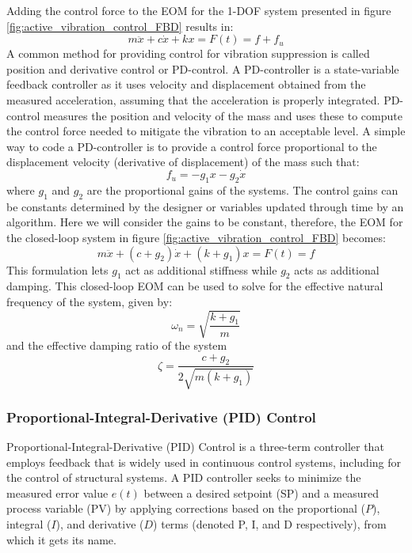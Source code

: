 \documentclass[12pt,letter]{article}
\begin{document}
Adding the control force to the EOM for the 1-DOF system presented in figure \ref{fig:active_vibration_control_FBD} results in:
\begin{equation}
m \ddot{x} + c \dot{x} + kx = F(t) = f + f_u
\end{equation}
A common method for providing control for vibration suppression is called position and derivative control or PD-control. A PD-controller is a state-variable feedback controller as it uses velocity and displacement obtained from the measured acceleration, assuming that the acceleration is properly integrated. PD-control measures the position and velocity of the mass and uses these to compute the control force needed to mitigate the vibration to an acceptable level. A simple way to code a PD-controller is to provide a control force proportional to the displacement velocity (derivative of displacement) of the mass such that:
\begin{equation}
f_u = -g_1x - g_2 \dot{x}
\end{equation}
where $g_1$ and $g_2$ are the proportional gains of the systems. The control gains can be constants determined by the designer or variables updated through time by an algorithm. Here we will consider the gains to be constant, therefore, the EOM for the closed-loop system in figure \ref{fig:active_vibration_control_FBD} becomes:
\begin{equation}
m \ddot{x} + (c + g_2) \dot{x} + (k + g_1)x = F(t) = f 
\end{equation}
This formulation lets $g_1$ act as additional stiffness while $g_2$ acts as additional damping. This closed-loop EOM can be used to solve for the effective natural frequency of the system, given by:
\begin{equation}
\omega_n = \sqrt{\frac{k+g_1}{m}}
\end{equation}
and the effective damping ratio of the system
\begin{equation}
\zeta = \frac{c+g_2}{2\sqrt{m(k+g_1)}}
\end{equation}


\subsubsection{Proportional-Integral-Derivative (PID) Control}

Proportional-Integral-Derivative (PID) Control is a three-term controller that employs feedback that is widely used in continuous control systems, including for the control of structural systems. A PID controller seeks to minimize the measured error value $e(t)$ between a desired setpoint (SP) and a measured process variable (PV) by applying corrections based on the proportional ($P$), integral ($I$), and derivative ($D$) terms (denoted P, I, and D respectively), from which it gets its name.
\end{document}

